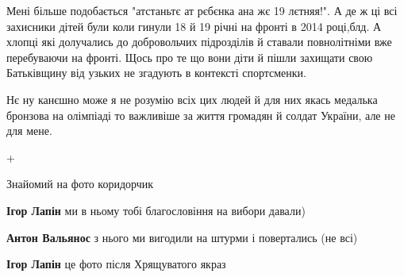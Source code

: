 \begin{itemize}
Мені більше подобається "атстаньтє ат рєбєнка ана жє 19 лєтняя!". А де ж ці всі
захисники дітей були коли гинули 18 й 19 річні на фронті в 2014 році,блд. А
хлопці які долучались до добровольчих підрозділів й ставали повнолітніми вже
перебуваючи на фронті. Щось про те що вони діти й пішли захищати свою
Батьківщину від узьких не згадують в контексті спортсменки.

Нє ну канєшно може я не розумію всіх цих людей й для них якась медалька
бронзова на олімпіаді то важливіше за життя громадян й солдат України, але не
для мене.


 

+

 

Знайомий на фото коридорчик

\begin{itemize}
 
\textbf{Ігор Лапін} ми в ньому тобі благословіння на вибори давали)

 

\textbf{Антон Вальянос} з нього ми вигодили на штурми і повертались (не всі)

 
\textbf{Ігор Лапін} це фото після Хрящуватого якраз
\end{itemize}


\end{itemize}
